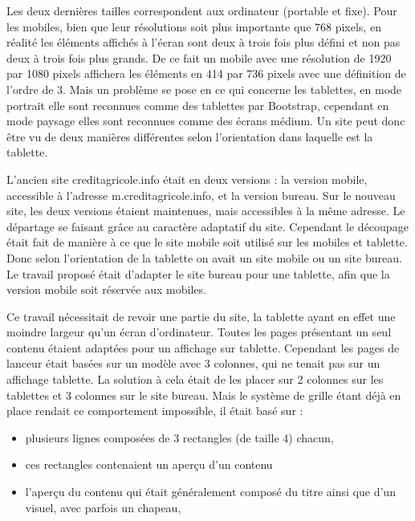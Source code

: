 \documentclass[12pt,a4paper]{article}
\begin{document}
Les deux dernières tailles correspondent aux ordinateur (portable et fixe). Pour les mobiles, bien que leur résolutions soit plus importante que 768 pixels, en réalité les éléments affichés à l'écran sont deux à trois fois plus défini et non pas deux à trois fois plus grands. De ce fait un mobile avec une résolution de 1920 par 1080 pixels affichera les éléments en 414 par 736 pixels avec une définition de l'ordre de 3. Mais un problème se pose en ce qui concerne les tablettes, en mode portrait elle sont reconnues comme des tablettes par Bootstrap, cependant en mode paysage elles sont reconnues comme des écrans médium. Un site peut donc être vu de deux manières différentes selon l'orientation dans laquelle est la tablette.\par
\bigskip
L'ancien site creditagricole.info était en deux versions : la version mobile, accessible à l'adresse m.creditagricole.info, et la version bureau. Sur le nouveau site, les deux versions étaient maintenues, mais accessibles à la même adresse. Le départage se faisant grâce au caractère adaptatif du site. Cependant le découpage était fait de manière à ce que le site mobile soit utilisé sur les mobiles et tablette. Donc selon l'orientation de la tablette on avait un site mobile ou un site bureau. Le travail proposé était d'adapter le site bureau pour une tablette, afin que la version mobile soit réservée aux mobiles.\par
Ce travail nécessitait de revoir une partie du site, la tablette ayant en effet une moindre largeur qu'un écran d'ordinateur. Toutes les pages présentant un seul contenu étaient adaptées pour un affichage sur tablette. Cependant les pages de lanceur était basées sur un modèle avec 3 colonnes, qui ne tenait pas sur un affichage tablette. La solution à cela était de les placer sur 2 colonnes sur les tablettes et 3 colonnes sur le site bureau. Mais le système de grille étant déjà en place rendait ce comportement impossible, il était basé sur :
\begin{itemize}
\item plusieurs lignes composées de 3 rectangles (de taille 4) chacun,
\item ces rectangles contenaient un aperçu d'un contenu
\item l'aperçu du contenu qui était généralement composé du titre ainsi que d'un visuel, avec parfois un chapeau,
\end{itemize}
\end{document}
